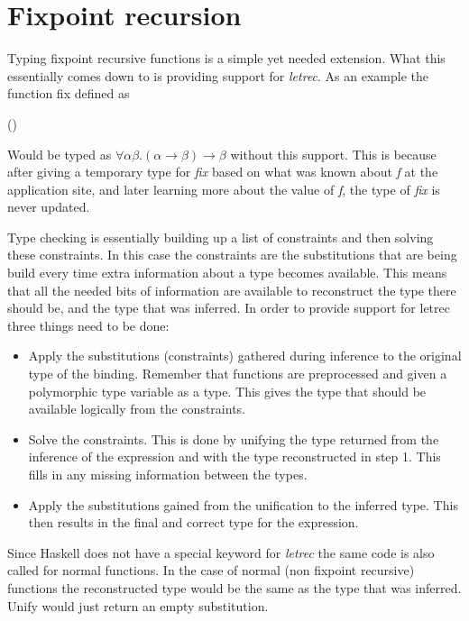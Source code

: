 \documentclass[twoside, titlepage, openright, a4paper]{book}
\newcommand{\Varid}[1]{\mathit{#1}}
\def\resethooks{%
  \global\let\SaveRestoreHook\empty
  \global\let\ColumnHook\empty}
\let\hspre\empty
\let\hspost\empty
\begin{document}
\begin{prooftree}
\end{prooftree} 
\section{Fixpoint recursion}
Typing fixpoint recursive functions is a simple yet needed extension. What this essentially comes down to is providing support for \emph{letrec}. As an example the function fix defined as

\begin{hscode}\SaveRestoreHook
\column{B}{@{}>{\hspre}l<{\hspost}@{}}%
\column{E}{@{}>{\hspre}l<{\hspost}@{}}%
\>[B]{}\Varid{fix}\;\Varid{f}\mathrel{=}\Varid{f}\;(\Varid{fix}\;\Varid{f}){}\<[E]%
\ColumnHook
\end{hscode}\resethooks

Would be typed as $\forall \alpha \beta. (\alpha \rightarrow \beta) \rightarrow \beta$ without this support. This is because after giving a temporary type for \emph{fix} based on what was known about \emph{f} at the application site, and later learning more about the value of \emph{f}, the type of \emph{fix} is never updated.

Type checking is essentially building up a list of constraints and then solving these constraints. In this case the constraints are the substitutions that are being build every time extra information about a type becomes available.
This means that all the needed bits of information are available to reconstruct the type there should be, and the type that was inferred. In order to provide support for letrec three things need to be done:

\begin{itemize}
\item Apply the substitutions (constraints) gathered during inference to the original type of the binding. Remember that functions are preprocessed and given a polymorphic type variable as a type. This gives the type that should be available logically from the constraints.
\item Solve the constraints. This is done by unifying the type returned from the inference of the expression and with the type reconstructed in step 1. This fills in any missing information between the types.
\item Apply the substitutions gained from the unification to the inferred type. This then results in the final and correct type for the expression.
\end{itemize}
Since Haskell does not have a special keyword for \emph{letrec} the same code is also called for normal functions. In the case of normal (non fixpoint recursive) functions the reconstructed type would be the same as the type that was inferred. Unify would just return an empty substitution.
\end{document}
